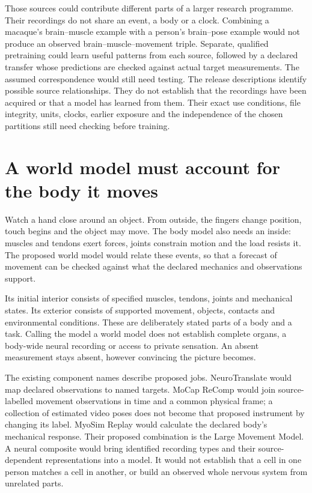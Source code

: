 Those sources could contribute different parts of a larger research programme. Their recordings do not share an event, a body or a clock. Combining a macaque's brain--muscle example with a person's brain--pose example would not produce an observed brain--muscle--movement triple. Separate, qualified pretraining could learn useful patterns from each source, followed by a declared transfer whose predictions are checked against actual target measurements. The assumed correspondence would still need testing. The release descriptions identify possible source relationships. They do not establish that the recordings have been acquired or that a model has learned from them. Their exact use conditions, file integrity, units, clocks, earlier exposure and the independence of the chosen partitions still need checking before training.

\section{A world model must account for the body it moves}

Watch a hand close around an object. From outside, the fingers change position, touch begins and the object may move. The body model also needs an inside: muscles and tendons exert forces, joints constrain motion and the load resists it. The proposed world model would relate these events, so that a forecast of movement can be checked against what the declared mechanics and observations support.

Its initial interior consists of specified muscles, tendons, joints and mechanical states. Its exterior consists of supported movement, objects, contacts and environmental conditions. These are deliberately stated parts of a body and a task. Calling the model a world model does not establish complete organs, a body-wide neural recording or access to private sensation. An absent measurement stays absent, however convincing the picture becomes.

The existing component names describe proposed jobs. NeuroTranslate would map declared observations to named targets. MoCap ReComp would join source-labelled movement observations in time and a common physical frame; a collection of estimated video poses does not become that proposed instrument by changing its label. MyoSim Replay would calculate the declared body's mechanical response. Their proposed combination is the Large Movement Model. A neural composite would bring identified recording types and their source-dependent representations into a model. It would not establish that a cell in one person matches a cell in another, or build an observed whole nervous system from unrelated parts.

